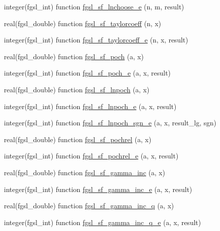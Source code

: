 \begin{DoxyCompactItemize}
\item 
integer(fgsl\+\_\+int) function \hyperlink{specfunc_8finc_a3e88f853a2bc050050fe4b95fcc934aa}{fgsl\+\_\+sf\+\_\+lnchoose\+\_\+e} (n, m, result)
\item 
real(fgsl\+\_\+double) function \hyperlink{specfunc_8finc_ada974ef72747d7801e2d156c9405e348}{fgsl\+\_\+sf\+\_\+taylorcoeff} (n, x)
\item 
integer(fgsl\+\_\+int) function \hyperlink{specfunc_8finc_a2a21bc0bca483d88ca6dbf497fad556e}{fgsl\+\_\+sf\+\_\+taylorcoeff\+\_\+e} (n, x, result)
\item 
real(fgsl\+\_\+double) function \hyperlink{specfunc_8finc_ad671fdb0ba4a2de7e928d1c0d9f817a3}{fgsl\+\_\+sf\+\_\+poch} (a, x)
\item 
integer(fgsl\+\_\+int) function \hyperlink{specfunc_8finc_a9c27185f9a79f0b502e4004eef77694f}{fgsl\+\_\+sf\+\_\+poch\+\_\+e} (a, x, result)
\item 
real(fgsl\+\_\+double) function \hyperlink{specfunc_8finc_ab4a6d83007f92e667128998936805deb}{fgsl\+\_\+sf\+\_\+lnpoch} (a, x)
\item 
integer(fgsl\+\_\+int) function \hyperlink{specfunc_8finc_afbc52045f5d774156b1059d51f83e1af}{fgsl\+\_\+sf\+\_\+lnpoch\+\_\+e} (a, x, result)
\item 
integer(fgsl\+\_\+int) function \hyperlink{specfunc_8finc_ab5b4bdeb8c0d3f934706161bb20443f5}{fgsl\+\_\+sf\+\_\+lnpoch\+\_\+sgn\+\_\+e} (a, x, result\+\_\+lg, sgn)
\item 
real(fgsl\+\_\+double) function \hyperlink{specfunc_8finc_a8a0327ea5087c41334d770c3c5b6436c}{fgsl\+\_\+sf\+\_\+pochrel} (a, x)
\item 
integer(fgsl\+\_\+int) function \hyperlink{specfunc_8finc_ad17f3c64c4a0b1929878d3ee767ad1d7}{fgsl\+\_\+sf\+\_\+pochrel\+\_\+e} (a, x, result)
\item 
real(fgsl\+\_\+double) function \hyperlink{specfunc_8finc_a4cc957b18f8e34d5708a9a6622076129}{fgsl\+\_\+sf\+\_\+gamma\+\_\+inc} (a, x)
\item 
integer(fgsl\+\_\+int) function \hyperlink{specfunc_8finc_a09464cf084f6cb6eb0b9431d4cb7755c}{fgsl\+\_\+sf\+\_\+gamma\+\_\+inc\+\_\+e} (a, x, result)
\item 
real(fgsl\+\_\+double) function \hyperlink{specfunc_8finc_a3094fbe23207acc003bcc48b10173e81}{fgsl\+\_\+sf\+\_\+gamma\+\_\+inc\+\_\+q} (a, x)
\item 
integer(fgsl\+\_\+int) function \hyperlink{specfunc_8finc_a56e429ccd4b6223adfde43c33d146249}{fgsl\+\_\+sf\+\_\+gamma\+\_\+inc\+\_\+q\+\_\+e} (a, x, result)

\end{DoxyCompactItemize}
